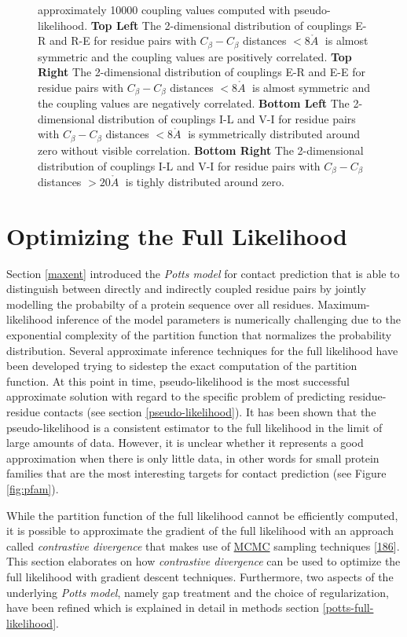 \documentclass[11pt,a4paper,twoside]{book}
\newcommand{\Cb}{C_\beta}
\newcommand{\angstrom}{\mathring{A} \;}
\theoremstyle{definition}
\theoremstyle{definition}
\theoremstyle{remark}
\begin{document}
\begin{figure}
{approximately 10000 coupling values computed with pseudo-likelihood.
\textbf{Top Left} The 2-dimensional distribution of couplings E-R and
R-E for residue pairs with \(\Cb-\Cb\) distances \(< 8 \angstrom\) is
almost symmetric and the coupling values are positively correlated.
\textbf{Top Right} The 2-dimensional distribution of couplings E-R and
E-E for residue pairs with \(\Cb-\Cb\) distances \(< 8 \angstrom\) is
almost symmetric and the coupling values are negatively correlated.
\textbf{Bottom Left} The 2-dimensional distribution of couplings I-L and
V-I for residue pairs with \(\Cb-\Cb\) distances \(< 8 \angstrom\) is
symmetrically distributed around zero without visible correlation.
\textbf{Bottom Right} The 2-dimensional distribution of couplings I-L
and V-I for residue pairs with \(\Cb-\Cb\) distances \(> 20 \angstrom\)
is tighly distributed around zero.}\label{fig:2d-coupling-profiles-0-8}
\end{figure}

\chapter{Optimizing the Full
Likelihood}\label{optimizing-full-likelihood}

Section \ref{maxent} introduced the \emph{Potts model} for contact
prediction that is able to distinguish between directly and indirectly
coupled residue pairs by jointly modelling the probabilty of a protein
sequence over all residues. Maximum-likelihood inference of the model
parameters is numerically challenging due to the exponential complexity
of the partition function that normalizes the probability distribution.
Several approximate inference techniques for the full likelihood have
been developed trying to sidestep the exact computation of the partition
function. At this point in time, pseudo-likelihood is the most
successful approximate solution with regard to the specific problem of
predicting residue-residue contacts (see section
\ref{pseudo-likelihood}). It has been shown that the pseudo-likelihood
is a consistent estimator to the full likelihood in the limit of large
amounts of data. However, it is unclear whether it represents a good
approximation when there is only little data, in other words for small
protein families that are the most interesting targets for contact
prediction (see Figure \ref{fig:pfam}).

While the partition function of the full likelihood cannot be
efficiently computed, it is possible to approximate the gradient of the
full likelihood with an approach called \emph{contrastive divergence}
that makes use of \protect\hyperlink{abbrev}{MCMC} sampling techniques
{[}\protect\hyperlink{ref-Hinton2002}{186}{]}. This section elaborates
on how \emph{contrastive divergence} can be used to optimize the full
likelihood with gradient descent techniques. Furthermore, two aspects of
the underlying \emph{Potts model}, namely gap treatment and the choice
of regularization, have been refined which is explained in detail in
methods section \ref{potts-full-likelihood}.
\end{document}
